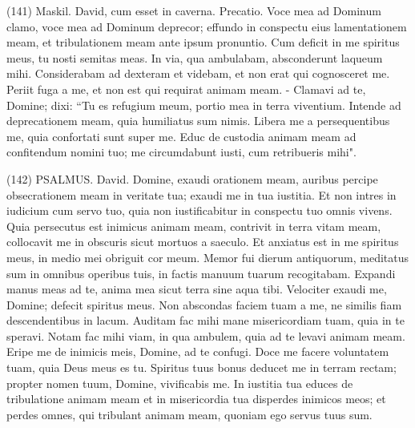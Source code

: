 \begin{biblechapter}  (141) 
\verse  Maskil. David, cum esset in caverna. Precatio. 
\verse Voce mea ad Dominum clamo, voce mea ad Dominum deprecor; 
\verse effundo in conspectu eius lamentationem meam, et tribulationem meam ante ipsum pronuntio. 
\verse Cum deficit in me spiritus meus, tu nosti semitas meas. In via, qua ambulabam, absconderunt laqueum mihi. 
\verse Considerabam ad dexteram et videbam, et non erat qui cognosceret me. Periit fuga a me, et non est qui requirat animam meam. - 
\verse Clamavi ad te, Domine; dixi: “Tu es refugium meum, portio mea in terra viventium. 
\verse Intende ad deprecationem meam, quia humiliatus sum nimis. Libera me a persequentibus me, quia confortati sunt super me. 
\verse Educ de custodia animam meam ad confitendum nomini tuo; me circumdabunt iusti, cum retribueris mihi". 
\end{biblechapter}

\begin{biblechapter}  (142) 
\verse  PSALMUS. David. Domine, exaudi orationem meam, auribus percipe obsecrationem meam in veritate tua; exaudi me in tua iustitia. 
\verse Et non intres in iudicium cum servo tuo, quia non iustificabitur in conspectu tuo omnis vivens. 
\verse Quia persecutus est inimicus animam meam, contrivit in terra vitam meam, collocavit me in obscuris sicut mortuos a saeculo. 
\verse Et anxiatus est in me spiritus meus, in medio mei obriguit cor meum. 
\verse Memor fui dierum antiquorum, meditatus sum in omnibus operibus tuis, in factis manuum tuarum recogitabam. 
\verse Expandi manus meas ad te, anima mea sicut terra sine aqua tibi. 
\verse Velociter exaudi me, Domine; defecit spiritus meus. Non abscondas faciem tuam a me, ne similis fiam descendentibus in lacum. 
\verse Auditam fac mihi mane misericordiam tuam, quia in te speravi. Notam fac mihi viam, in qua ambulem, quia ad te levavi animam meam. 
\verse Eripe me de inimicis meis, Domine, ad te confugi. 
\verse Doce me facere voluntatem tuam, quia Deus meus es tu. Spiritus tuus bonus deducet me in terram rectam; 
\verse propter nomen tuum, Domine, vivificabis me. In iustitia tua educes de tribulatione animam meam 
\verse et in misericordia tua disperdes inimicos meos; et perdes omnes, qui tribulant animam meam, quoniam ego servus tuus sum. 
\end{biblechapter}

